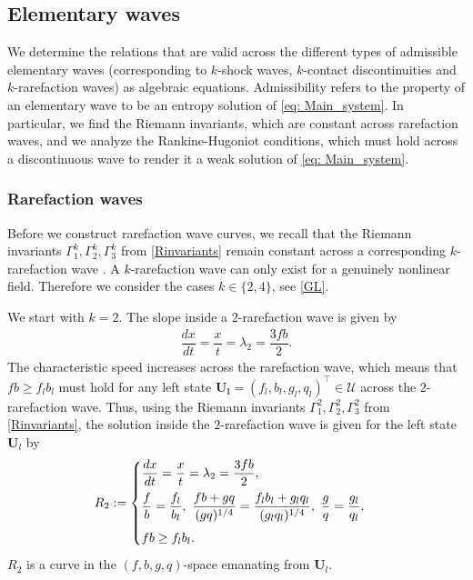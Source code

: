 \documentclass[11pt]{article}
\numberwithin{equation}{section}
\newtheorem{counter example}[theorem]{Counter Example}
\begin{document}
{\subsection{Elementary waves\label{subsec: 4.1}}
We determine the relations that are valid across the different types of admissible elementary waves (corresponding to $k$-shock waves, $k$-contact discontinuities and $k$-rarefaction waves) as algebraic equations. Admissibility refers to the property of an elementary wave to be an entropy solution of \eqref{eq: Main_system}. In particular, we find the Riemann invariants, which are constant across rarefaction waves, and we analyze the Rankine-Hugoniot conditions, which must hold across a discontinuous wave to render it a weak solution of \eqref{eq: Main_system}.
\subsubsection{Rarefaction waves}\label{subsubsec: rarefaction}
Before we construct rarefaction wave curves, we
recall that the Riemann invariants  $\Gamma^k_1,\Gamma^k_2,\Gamma^k_3$ from \eqref{Rinvariants} remain constant across a corresponding $k$-rarefaction wave \cite{dafermos2005hyperbolic}.
A $k$-rarefaction wave can only exist for a genuinely nonlinear field. Therefore we consider the cases $k\in \{2,4\}$, see \eqref{GL}.

We start with $k=2$. The slope inside a $2$-rarefaction  wave is given by
\begin{align*}
    \dfrac{dx}{dt}=\dfrac{x}{t}=\lambda_2=\dfrac{3fb}{2}.
\end{align*}
The characteristic speed increases across the rarefaction wave, which means that $fb\geq f_lb_l$ must hold for any left state $\mathbf{U_l}=(f_l, b_l, g_l, q_l)^{\top}\in \mathcal{U}$ across the $2$-rarefaction wave. 
Thus, using the Riemann invariants $\Gamma^2_1,\Gamma^2_2,\Gamma^2_3$ from \eqref{Rinvariants}, the solution inside the $2$-rarefaction wave is given for the left state $\mathbf{U}_l$ by 
\begin{align}\label{eq: 4.2R} R_2:=
    \begin{cases}
        \dfrac{dx}{dt}=\dfrac{x}{t}=\lambda_2=\dfrac{3fb}{2},\vspace{0.2 cm}\\
        \dfrac{f}{b}=\dfrac{f_l}{b_l},~\dfrac{fb+gq}{(gq)^{1/4}}=\dfrac{f_lb_l+g_lq_l}{(g_lq_l)^{1/4}}, ~\dfrac{g}{q}=\dfrac{g_l}{q_l},\vspace{0.2 cm}\\
        fb\geq f_lb_l.
    \end{cases}
\end{align}
$R_2$ is a curve in  the $(f, b, g, q)$-space emanating from $\mathbf{U}_l$.

}
\end{document}
